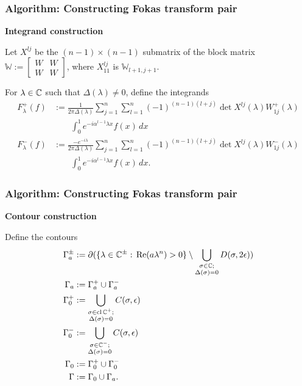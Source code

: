 \documentclass{beamer}
\begin{document}
\begin{frame}[t]
    \frametitle{Algorithm: Constructing Fokas transform pair}
    \textbf{Integrand construction}
    
    Let $X^{lj}$ be the $(n-1)\times (n-1)$ submatrix of the block matrix $\mathbb{W}:=\begin{bmatrix}W & W\\ W & W\end{bmatrix}$, where $X^{lj}_{11}$ is $\mathbb{W}_{l+1, j+1}$.
    
    For $\lambda\in\mathbb C$ such that $\Delta(\lambda)\neq 0$, define the integrands
        \begin{align*}
            F^+_\lambda(f) &:= \frac{1}{2\pi \Delta(\lambda)} \sum_{j=1}^n\sum_{l=1}^n(-1)^{(n-1)(l+j)}\det X^{lj}(\lambda)W^+_{1j}(\lambda)\\
            &\qquad \int_0^1 e^{-i\alpha^{l-1}\lambda x}f(x)\,dx\\
            F^-_\lambda(f) &:= \frac{-e^{-i\lambda}}{2\pi \Delta(\lambda)} \sum_{j=1}^n\sum_{l=1}^n(-1)^{(n-1)(l+j)}\det X^{lj}(\lambda)W^-_{1j}(\lambda)\\
            &\qquad \int_0^1 e^{-i\alpha^{l-1}\lambda x}f(x)\,dx.
        \end{align*}
\end{frame}

\begin{frame}[t]
    \frametitle{Algorithm: Constructing Fokas transform pair}
    \textbf{Contour construction}
    
    Define the contours
            \begin{align*}
                \Gamma_a^{\pm} &:= \partial(\{\lambda\in\mathbb C^{\pm}:\, \mathrm{Re}(a\lambda^n)>0\}\setminus \bigcup_{\substack{\sigma\in\mathbb C;\\\Delta(\sigma)=0}} D(\sigma, 2\epsilon))\\
                \Gamma_a &:= \Gamma_a^+\cup \Gamma_a^-\\
                \Gamma_0^+ &:= \bigcup_{\substack{\sigma\in\operatorname{cl}\mathbb C^+;\\ \Delta(\sigma)=0}} C(\sigma, \epsilon)\\
                \Gamma_0^- &:= \bigcup_{\substack{\sigma\in\mathbb C^-;\\ \Delta(\sigma)=0}} C(\sigma, \epsilon)\\
                \Gamma_0 &:= \Gamma_0^+\cup \Gamma_0^-\\
                \Gamma &:= \Gamma_0\cup \Gamma_a.
            \end{align*}
\end{frame}
\end{document}
